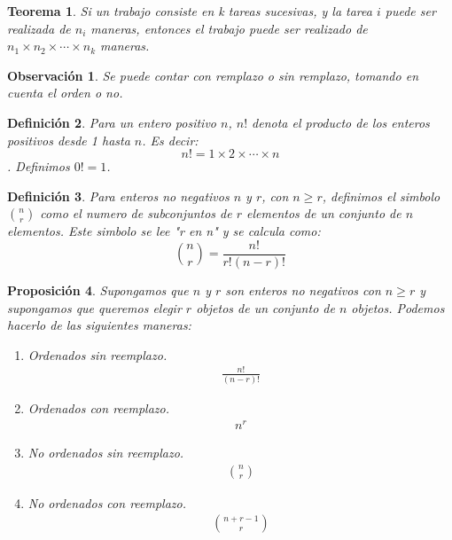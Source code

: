 \documentclass[14pt]{extarticle}
\newtheorem{theorem}{Teorema}[section]
\newtheorem{proposition}[theorem]{Proposición}
\newtheorem{definition}[theorem]{Definición}
\newtheorem{remark}{Observación}[section]
\begin{document}
\begin{theorem}
    Si un trabajo consiste en k tareas sucesivas, y la tarea $i$ puede ser realizada de $n_i$ maneras, entonces el trabajo
    puede ser realizado de $n_1 \times n_2 \times \cdots \times n_k$ maneras.
\end{theorem}

\begin{remark}
    Se puede contar con remplazo o sin remplazo, tomando en cuenta el orden o no.
\end{remark}

\begin{definition}
Para un entero positivo $n$, $n!$ denota el producto de los enteros positivos desde 1 hasta $n$.
Es decir: $$n! = 1 \times 2 \times \cdots \times n$$.
Definimos $0! = 1$.
\end{definition}

\begin{definition}
    Para enteros no negativos $n$ y $r$, con $n \geq r$, definimos el simbolo $\binom{n}{r}$ como el numero de subconjuntos
    de $r$ elementos de un conjunto de $n$ elementos. Este simbolo se lee "r en n" y se calcula como:
    \[
        \binom{n}{r} = \frac{n!}{r!(n-r)!}
    \]
\end{definition}

\begin{proposition}
    Supongamos que $n$ y $r$ son enteros no negativos con $n \geq r$ y supongamos que queremos elegir $r$ objetos de un conjunto
    de $n$ objetos. Podemos hacerlo de las siguientes maneras:
    \begin{enumerate}
        \item Ordenados sin reemplazo.
        \begin{align*}  
            \frac{n!}{(n-r)!}
        \end{align*}
        \item Ordenados con reemplazo.
        \begin{align*}
            n^r
        \end{align*}
        \item No ordenados sin reemplazo.
        \begin{align*}
            \binom{n}{r}
        \end{align*}
        \item No ordenados con reemplazo.
        \begin{align*}
            \binom{n+r-1}{r}
        \end{align*}
    \end{enumerate}
\end{proposition}
\end{document}
